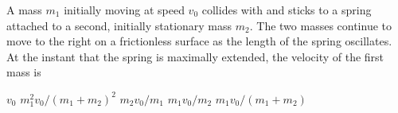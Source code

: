 \documentclass{../../../oss-classkick-exam}
\begin{document}
\begin{multicols*}{2}
\begin{questions}
    
    \question A mass $m_1$ initially moving at speed $v_0$ collides with and
    sticks to a spring attached to a second, initially stationary mass $m_2$.
    The two masses continue to move to the right on a frictionless surface as
    the length of the spring oscillates. At the instant that the spring is
    maximally extended, the velocity of the first mass is
    \begin{center}
    \end{center}
    \begin{choices}
      \choice $v_0$
      \choice $m_1^2v_0/(m_1+m_2)^2$
      \choice $m_2v_0/m_1$
      \choice $m_1v_0/m_2$
      \choice $m_1v_0/(m_1+m_2)$
    \end{choices}
  \end{questions}
\end{multicols*}
\newpage
\end{document}
